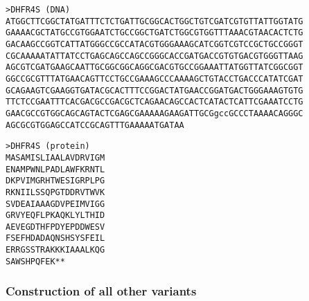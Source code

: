 %
\begin{footnotesize}
\begin{minipage}[t]{9cm}
\begin{verbatim}
>DHFR4S (DNA)
ATGGCTTCGGCTATGATTTCTCTGATTGCGGCACTGGCTGTCGATCGTGTTATTGGTATG
GAAAACGCTATGCCGTGGAATCTGCCGGCTGATCTGGCGTGGTTTAAACGTAACACTCTG
GACAAGCCGGTCATTATGGGCCGCCATACGTGGGAAAGCATCGGTCGTCCGCTGCCGGGT
CGCAAAAATATTATCCTGAGCAGCCAGCCGGGCACCGATGACCGTGTGACGTGGGTTAAG
AGCGTCGATGAAGCAATTGCGGCGGCAGGCGACGTGCCGGAAATTATGGTTATCGGCGGT
GGCCGCGTTTATGAACAGTTCCTGCCGAAAGCCCAAAAGCTGTACCTGACCCATATCGAT
GCAGAAGTCGAAGGTGATACGCACTTTCCGGACTATGAACCGGATGACTGGGAAAGTGTG
TTCTCCGAATTTCACGACGCCGACGCTCAGAACAGCCACTCATACTCATTCGAAATCCTG
GAACGCCGTGGCAGCAGTACTCGAGCGAAAAAGAAGATTGCGgccGCCCTAAAACAGGGC
AGCGCGTGGAGCCATCCGCAGTTTGAAAAATGATAA
\end{verbatim}
\end{minipage}
%

%
\begin{minipage}[t]{3cm}
\begin{verbatim}
>DHFR4S (protein)
MASAMISLIAALAVDRVIGM
ENAMPWNLPADLAWFKRNTL
DKPVIMGRHTWESIGRPLPG
RKNIILSSQPGTDDRVTWVK
SVDEAIAAAGDVPEIMVIGG
GRVYEQFLPKAQKLYLTHID
AEVEGDTHFPDYEPDDWESV
FSEFHDADAQNSHSYSFEIL
ERRGSSTRAKKKIAAALKQG
SAWSHPQFEK**
\end{verbatim}
\end{minipage}
\end{footnotesize}
%

\subsubsection{Construction of all other variants}

